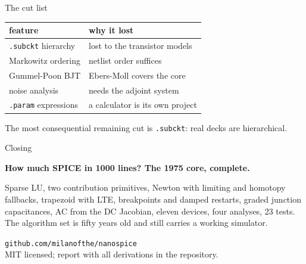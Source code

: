 \documentclass[11pt, aspectratio=169]{beamer}
\begin{document}
\begin{frame}{The cut list}
\begin{center}
\begin{tabular}{ll}
\toprule
feature & why it lost \\
\midrule
\texttt{.subckt} hierarchy & lost to the transistor models \\
Markowitz ordering & netlist order suffices \\
Gummel-Poon BJT & Ebers-Moll covers the core \\
noise analysis & needs the adjoint system \\
\texttt{.param} expressions & a calculator is its own project \\
\bottomrule
\end{tabular}
\end{center}
\vspace{2mm}
The most consequential remaining cut is \texttt{.subckt}: real decks are
hierarchical.
\end{frame}

\begin{frame}{Closing}
\begin{center}
{\large \textbf{How much SPICE in 1000 lines? The 1975 core, complete.}}
\end{center}
\vspace{2mm}
Sparse LU, two contribution primitives, Newton with limiting and homotopy
fallbacks, trapezoid with LTE, breakpoints and damped restarts, graded
junction capacitances, AC from the DC Jacobian, eleven devices, four
analyses, 23 tests. The algorithm set is fifty years old and still
carries a working simulator.
\vspace{4mm}
\begin{center}
\texttt{github.com/milanofthe/nanospice}\\[1mm]
{\footnotesize MIT licensed; report with all derivations in the repository.}
\end{center}
\end{frame}
\end{document}
